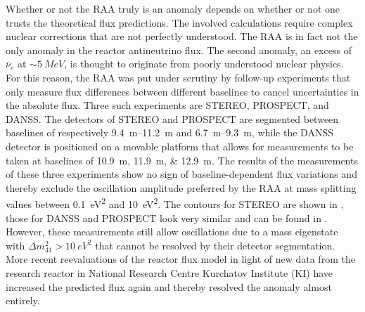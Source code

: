 Whether or not the RAA truly is an anomaly depends on whether or not one trusts the theoretical flux predictions. The involved calculations require complex nuclear corrections that are not perfectly understood. The RAA is in fact not the only anomaly in the reactor antineutrino flux. The second anomaly, an excess of $\bar{\nu}_e$ at $\sim \SI{5}{MeV}$, is thought to originate from poorly understood nuclear physics\cite{HUBER2016268}. For this reason, the RAA was put under scrutiny by follow-up experiments that only measure flux differences between different baselines to cancel uncertainties in the absolute flux. Three such experiments are STEREO, PROSPECT, and DANSS. The detectors of STEREO and PROSPECT are segmented between baselines of respectively \SIrange{9.4}{11.2}{m} and \SIrange{6.7}{9.3}{m}, while the DANSS detector is positioned on a movable platform that allows for measurements to be taken at baselines of \SIlist{10.9;11.9;12.9}{m}. The results of the measurements of these three experiments show no sign of baseline-dependent flux variations and thereby exclude the oscillation amplitude preferred by the RAA at mass splitting values between \SI{0.1}{eV^2} and \SI{10}{eV^2}. The contours for \textsc{STEREO} are shown in , those for \textsc{DANSS} and \textsc{PROSPECT} look very similar and can be found in \cite{Licciardi:2021hyi}. However, these measurements still allow oscillations due to a mass eigenstate with $\Delta m^2_{41}> \SI{10}{eV^2}$ that cannot be resolved by their detector segmentation. More recent reevaluations of the reactor flux model in light of new data from the research reactor in National Research Centre Kurchatov Institute (KI) have increased the predicted flux again and thereby resolved the anomaly almost entirely.

